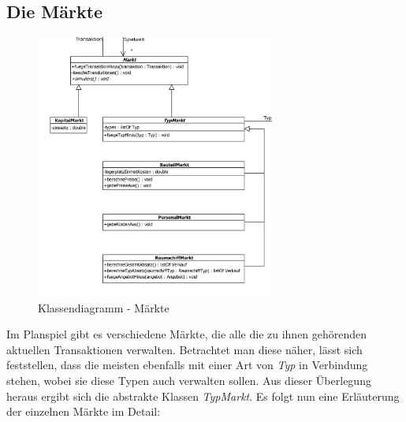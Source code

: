\subsection{Die Märkte}
\begin{figure}[ht]
     \centering
     \includegraphics[width=0.7\textwidth]{30_Fachkonzept/20_Entwurf/markt}
     \caption{Klassendiagramm - Märkte}
     \label{img:fachkonzept-entwurf-markt}
\end{figure}

Im Planspiel gibt es verschiedene Märkte, die alle die zu ihnen gehörenden aktuellen Transaktionen verwalten. Betrachtet man diese näher, lässt sich feststellen, dass die meisten ebenfalls mit einer Art von \textit{Typ} in Verbindung stehen, wobei sie diese Typen auch verwalten sollen. Aus dieser Überlegung heraus ergibt sich die abstrakte Klassen \textit{TypMarkt}. Es folgt nun eine Erläuterung der einzelnen Märkte im Detail:

